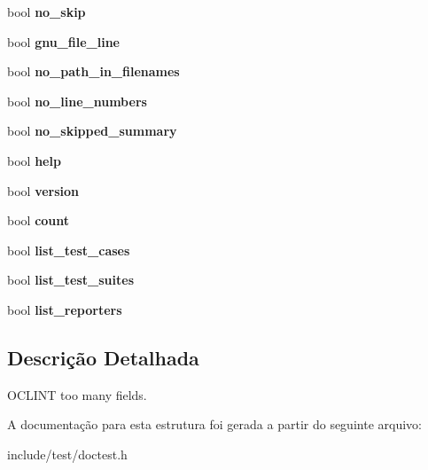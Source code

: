 \begin{DoxyCompactItemize}
\mbox{\label{structdoctest_1_1ContextOptions_a56344ffa781ee4da6cbf3f6c11da8564}} 
bool {\bfseries no\+\_\+skip}
\item 
\mbox{\label{structdoctest_1_1ContextOptions_aab894e731a6fc86cf095288ec7d0c0f2}} 
bool {\bfseries gnu\+\_\+file\+\_\+line}
\item 
\mbox{\label{structdoctest_1_1ContextOptions_a1e9a8bf8feba5cfe25558e5977c4bd7c}} 
bool {\bfseries no\+\_\+path\+\_\+in\+\_\+filenames}
\item 
\mbox{\label{structdoctest_1_1ContextOptions_a880207c3b4cc98fc5c8d94998841e837}} 
bool {\bfseries no\+\_\+line\+\_\+numbers}
\item 
\mbox{\label{structdoctest_1_1ContextOptions_a4e22eec59e63ed4ff6ab4dfce2389c99}} 
bool {\bfseries no\+\_\+skipped\+\_\+summary}
\item 
\mbox{\label{structdoctest_1_1ContextOptions_a9d542a95ee03f61c233fff51e7461400}} 
bool {\bfseries help}
\item 
\mbox{\label{structdoctest_1_1ContextOptions_a08931527a9e5e634e64a336e5493a7c1}} 
bool {\bfseries version}
\item 
\mbox{\label{structdoctest_1_1ContextOptions_a4651b5efbaf2ffc03d60fb4140d21dd3}} 
bool {\bfseries count}
\item 
\mbox{\label{structdoctest_1_1ContextOptions_a813e1543c358ab8a7a432b4ad2b32e56}} 
bool {\bfseries list\+\_\+test\+\_\+cases}
\item 
\mbox{\label{structdoctest_1_1ContextOptions_a579399a66b278cbf96b6183d337f486b}} 
bool {\bfseries list\+\_\+test\+\_\+suites}
\item 
\mbox{\label{structdoctest_1_1ContextOptions_ad3daf077ac3182db5175f8baff49fce0}} 
bool {\bfseries list\+\_\+reporters}
\end{DoxyCompactItemize}


\subsection{Descrição Detalhada}
O\+C\+L\+I\+NT too many fields. 

A documentação para esta estrutura foi gerada a partir do seguinte arquivo\+:\begin{DoxyCompactItemize}
\item 
include/test/doctest.\+h\end{DoxyCompactItemize}
